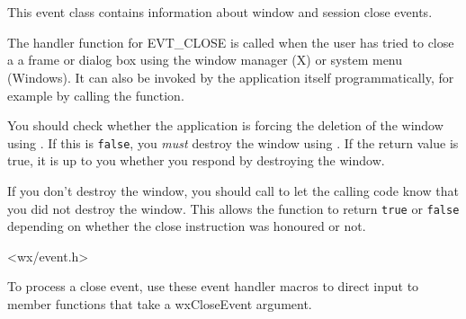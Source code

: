 \section{}\label{wxcloseevent}

This event class contains information about window and session close events.

The handler function for EVT\_CLOSE is called when the user has tried to close a a frame
or dialog box using the window manager (X) or system menu (Windows). It can
also be invoked by the application itself programmatically, for example by
calling the  function.

You should check whether the application is forcing the deletion of the window
using . If this is {\tt false},
you {\it must} destroy the window using .
If the return value is true, it is up to you whether you respond by destroying the window.

If you don't destroy the window, you should call  to
let the calling code know that you did not destroy the window. This allows the  function
to return {\tt true} or {\tt false} depending on whether the close instruction was honoured or not.




<wx/event.h>




To process a close event, use these event handler macros to direct input to member
functions that take a wxCloseEvent argument.

\twocolwidtha{7cm}
\begin{twocollist}\itemsep=0pt
\end{twocollist}%

